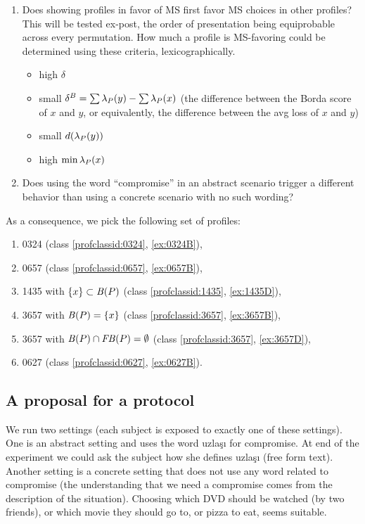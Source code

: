 \documentclass[pagesize, twoside=off, bibliography=totoc, DIV=calc, fontsize=12pt, a4paper]{scrartcl}
\begin{document}
\begin{enumerate}
	\item Does showing profiles in favor of MS first favor MS choices in other profiles? This will be tested ex-post, the order of presentation being equiprobable across every permutation.
	How much a profile is MS-favoring could be determined using these criteria, lexicographically.
	\begin{itemize}
		\item high $\delta$
		\item small $\delta^B = \sum \lambda_P(y) - \sum \lambda_P(x)$ (the difference between the Borda score of $x$ and $y$, or equivalently, the difference between the avg loss of $x$ and $y$)
		\item small $d(\lambda_P(y))$
		\item high $\min \lambda_P(x)$
	\end{itemize}
	\item Does using the word “compromise” in an abstract scenario trigger a different behavior than using a concrete scenario with no such wording?
\end{enumerate}
As a consequence, we pick the following set of profiles:
\begin{enumerate}
	\item 0324 (class \ref{profclassid:0324}, \cref{ex:0324B}), 
	\item 0657 (class \ref{profclassid:0657}, \cref{ex:0657B}), 
	\item 1435 with $\{x\} \subset \mathit{B}(P)$ (class \ref{profclassid:1435}, \cref{ex:1435D}), 
	\item 3657 with $\mathit{B}(P) = \{x\}$ (class \ref{profclassid:3657}, \cref{ex:3657B}), 
	\item 3657 with $\mathit{B}(P) \cap \mathit{FB}(P) = \emptyset$ (class \ref{profclassid:3657}, \cref{ex:3657D}), 
	\item 0627 (class \ref{profclassid:0627}, \cref{ex:0627B}).
\end{enumerate}

\subsection{A proposal for a protocol}
We run two settings (each subject is exposed to exactly one of these settings).
One is an abstract setting and uses the word uzlaşı for compromise. At end of the experiment we could ask the subject how she defines uzlaşı (free form text).
Another setting is a concrete setting that does not use any word related to compromise (the understanding that we need a compromise comes from the description of the situation). Choosing which DVD should be watched (by two friends), or which movie they should go to, or pizza to eat, seems suitable.
\end{document}
